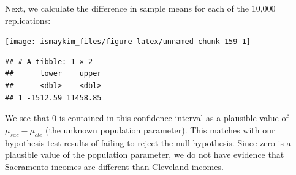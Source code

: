\documentclass[]{tufte-book}
\newenvironment{Shaded}{\begin{snugshade}}{\end{snugshade}}
\newcommand{\KeywordTok}[1]{\textcolor[rgb]{0.13,0.29,0.53}{\textbf{{#1}}}}
\newcommand{\DataTypeTok}[1]{\textcolor[rgb]{0.13,0.29,0.53}{{#1}}}
\newcommand{\DecValTok}[1]{\textcolor[rgb]{0.00,0.00,0.81}{{#1}}}
\newcommand{\FloatTok}[1]{\textcolor[rgb]{0.00,0.00,0.81}{{#1}}}
\newcommand{\StringTok}[1]{\textcolor[rgb]{0.31,0.60,0.02}{{#1}}}
\newcommand{\NormalTok}[1]{{#1}}
\begin{document}
Next, we calculate the difference in sample means for each of the 10,000
replications:

\begin{Shaded}
\end{Shaded}

\begin{Shaded}
\end{Shaded}

\begin{center}\texttt{[image: ismaykim\_files/figure-latex/unnamed-chunk-159-1]} \end{center}

\begin{Shaded}
\end{Shaded}

\begin{verbatim}
## # A tibble: 1 × 2
##      lower    upper
##      <dbl>    <dbl>
## 1 -1512.59 11458.85
\end{verbatim}

We see that 0 is contained in this confidence interval as a plausible
value of \(\mu_{sac} - \mu_{cle}\) (the unknown population parameter).
This matches with our hypothesis test results of failing to reject the
null hypothesis. Since zero is a plausible value of the population
parameter, we do not have evidence that Sacramento incomes are different
than Cleveland incomes.
\end{document}
